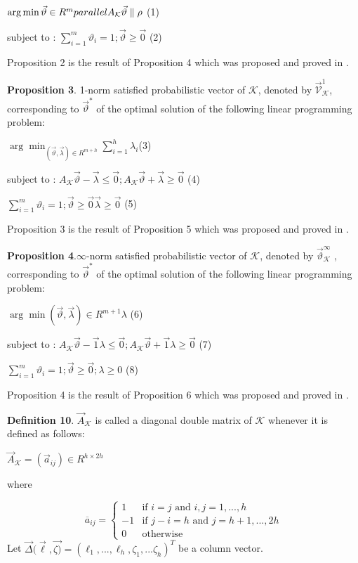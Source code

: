 \documentclass[]{iosart2c}
\begin{document}
  $\arg \min\vec{\vartheta}\in R^m\\parallel A_\mathcal{K} \vec{\vartheta}\parallel\rho$ (1)

  subject to : $\sum^m_{i=1}\vartheta_i = 1; \vec{\vartheta}\geq\vec{0}$ (2)

  Proposition 2 is the result of Proposition 4 which was proposed and proved in \cite{10}.

  \textbf{Proposition 3}. 1-norm satisfied probabilistic vector of $\mathcal{K}$, denoted by $\vec{\mathcal{V}}^1_\mathcal{K}$, corresponding to $\vec{\vartheta}^*$ of the optimal solution of the following linear programming problem:

  $\arg \min _{(\vec{\vartheta},\vec{\lambda}) \in R^{m+h}} \sum^h_{i=1}\lambda_i$(3)

  subject to : $A_\mathcal{K} \vec{\vartheta} - \vec{\lambda} \le \vec{0}; A_\mathcal{K}\vec{\vartheta} + \vec{\lambda}\geq\vec{0}$ (4)

  $\sum^m_{i=1} \vartheta_i = 1; \vec{\vartheta}\geq\vec{0}    \vec{\lambda}\geq \vec{0}$ (5)

  Proposition 3 is the result of Proposition 5 which was proposed and proved in \cite{10}.

  \textbf{Proposition 4}.$\infty$-norm satisfied probabilistic vector of $\mathcal{K}$, denoted by $\vec{\vartheta}^\infty_\mathcal{K}$ , corresponding to $\vec{\vartheta}^*$ of the optimal solution of the following linear programming problem:

  $\arg \min(\vec{\vartheta},\vec{\lambda}) \in R^{m+1}\lambda$ (6)

  subject to : $A_\mathcal{K}\vec{\vartheta} -\vec{1}\lambda \le \vec{0}; A_\mathcal{K}\vec{\vartheta} +\vec{1}\lambda \geq \vec{0}$ (7)

  $\sum^m_{i=1} \vartheta_i = 1; \vec{\vartheta}\geq\vec{0}; \lambda\geq 0$ (8)

  Proposition 4 is the result of Proposition 6 which was proposed and proved in \cite{10}.

  \textbf{Definition 10}. $\vec{A}_\mathcal{K}$ is called a diagonal double matrix of $\mathcal{K}$ whenever it is defined as follows:

  $\vec{A}_\mathcal{K} = (\vec{a}_{ij}) \in R^{h \times 2h}$

  where

  $$\overline{a}_{ij} =
  \begin{cases}
    1        &\text{if $i = j$ and $i, j = 1, ... , h$}\\
    -1    &\text{if $j - i = h$ and $j = h + 1, ... , 2h$}\\
    0        &\text{otherwise}
  \end{cases}
  $$
  Let $\vec{\Delta}(\vec{\ell},\vec{\zeta)} = (\ell_1, ..., \ell_h, \zeta_1, ...\zeta_h)^T$ be a column vector.
\end{document}
